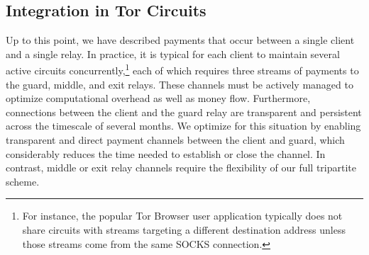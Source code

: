 \subsection{Integration in Tor Circuits}

Up to this point, we have described payments that occur between a single client and a single relay.
In practice, it is typical for each client to maintain several active circuits concurrently,\footnote{For instance, the popular Tor Browser user application typically does not share circuits with streams targeting a different destination address unless those streams come from the same SOCKS connection.}
each of which requires three streams of payments to the guard, middle, and exit relays.
These channels must be actively managed to optimize computational overhead as well as money flow.
Furthermore, connections between the client and the guard relay are transparent and persistent across the timescale of several months.
We optimize for this situation by enabling transparent and direct payment channels between the client and guard, which considerably reduces the time needed to establish or close the channel.
In contrast, middle or exit relay channels require the flexibility of our full tripartite scheme.

